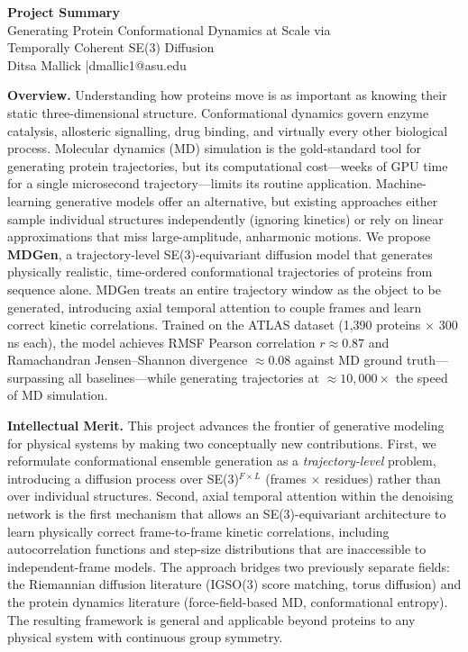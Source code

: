 \documentclass[12pt,letterpaper]{article}
\begin{document}

\begin{center}
{\Large\textbf{Project Summary}}\\[4pt]
{\large Generating Protein Conformational Dynamics at Scale via\\
Temporally Coherent SE(3) Diffusion}\\[4pt]
Ditsa Mallick \quad|\quad dmallic1@asu.edu
\end{center}

\vspace{6pt}
\noindent\textbf{Overview.}
Understanding how proteins move is as important as knowing their static three-dimensional structure. Conformational dynamics govern enzyme catalysis, allosteric signalling, drug binding, and virtually every other biological process. Molecular dynamics (MD) simulation is the gold-standard tool for generating protein trajectories, but its computational cost—weeks of GPU time for a single microsecond trajectory—limits its routine application. Machine-learning generative models offer an alternative, but existing approaches either sample individual structures independently (ignoring kinetics) or rely on linear approximations that miss large-amplitude, anharmonic motions. We propose \textbf{MDGen}, a trajectory-level SE(3)-equivariant diffusion model that generates physically realistic, time-ordered conformational trajectories of proteins from sequence alone. MDGen treats an entire trajectory window as the object to be generated, introducing axial temporal attention to couple frames and learn correct kinetic correlations. Trained on the ATLAS dataset (1,390 proteins $\times$ 300\,ns each), the model achieves RMSF Pearson correlation $r\approx0.87$ and Ramachandran Jensen--Shannon divergence $\approx0.08$ against MD ground truth—surpassing all baselines—while generating trajectories at $\approx\!10{,}000\times$ the speed of MD simulation.

\vspace{6pt}
\noindent\textbf{Intellectual Merit.}
This project advances the frontier of generative modeling for physical systems by making two conceptually new contributions. First, we reformulate conformational ensemble generation as a \emph{trajectory-level} problem, introducing a diffusion process over SE(3)$^{F\times L}$ (frames $\times$ residues) rather than over individual structures. Second, axial temporal attention within the denoising network is the first mechanism that allows an SE(3)-equivariant architecture to learn physically correct frame-to-frame kinetic correlations, including autocorrelation functions and step-size distributions that are inaccessible to independent-frame models. The approach bridges two previously separate fields: the Riemannian diffusion literature (IGSO(3) score matching, torus diffusion) and the protein dynamics literature (force-field-based MD, conformational entropy). The resulting framework is general and applicable beyond proteins to any physical system with continuous group symmetry.
\end{document}
